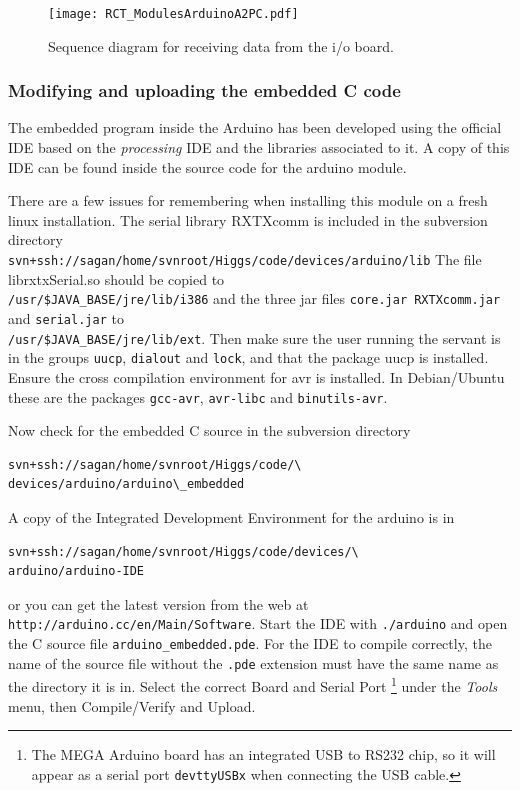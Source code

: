 \begin{figure}[htbp]
\begin{center}
 {\texttt{[image: RCT\_ModulesArduinoA2PC.pdf]}}
\end{center}
\caption{Sequence diagram for receiving data from the i/o board.}
\label{fig:ModulesArduinoA2PC}
\end{figure}

\subsubsection{Modifying and uploading the embedded C code}

The embedded program inside the Arduino has been developed using the official IDE
based on the \emph{processing} IDE and the libraries associated to it. A copy of this IDE
can be found inside the source code for the arduino module.

There are a few issues for remembering when installing this module on a fresh
linux installation.
The serial library RXTXcomm is included in the subversion directory \\
\texttt{svn+ssh://sagan/home/svnroot/Higgs/code/devices/arduino/lib}
The file librxtxSerial.so should be copied to \\ \texttt{/usr/\$JAVA\_BASE/jre/lib/i386} and
the three jar files \texttt{core.jar RXTXcomm.jar} and \texttt{serial.jar} to \\
\texttt{/usr/\$JAVA\_BASE/jre/lib/ext}.
Then make sure the user running the servant is in the groups \texttt{uucp}, \texttt{dialout} and
\texttt{lock}, and
that the package uucp is installed. Ensure the cross compilation environment for avr is installed. In Debian/Ubuntu these
are the packages \texttt{gcc-avr}, \texttt{avr-libc} and \texttt{binutils-avr}.

Now check for the embedded C source in the subversion directory
\begin{verbatim}
svn+ssh://sagan/home/svnroot/Higgs/code/\
devices/arduino/arduino\_embedded
\end{verbatim}
A copy of the Integrated Development Environment for the arduino is in
\begin{verbatim}
svn+ssh://sagan/home/svnroot/Higgs/code/devices/\
arduino/arduino-IDE
\end{verbatim}
or you can get the latest version from the web at \\
\texttt{http://arduino.cc/en/Main/Software}.
Start the IDE with \texttt{./arduino} and open the C source file \texttt{arduino\_embedded.pde}.
For the IDE to compile correctly, the name of the source file without the \texttt{.pde}
extension must have the same name as the directory it is in. Select the correct Board and Serial Port
\footnote{The MEGA Arduino board has an integrated USB to RS232 chip, so it will appear as a serial port
\texttt{\/dev\/ttyUSBx} when connecting the USB cable.}
under the \textit{Tools} menu, then Compile/Verify and Upload.

